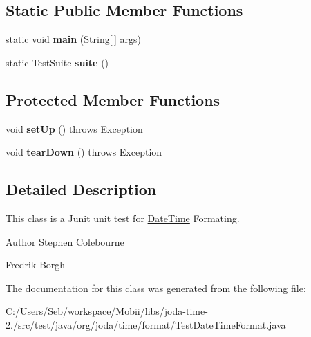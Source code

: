 \subsection*{Static Public Member Functions}
\begin{DoxyCompactItemize}
\item 
\hypertarget{classorg_1_1joda_1_1time_1_1format_1_1_test_date_time_format_a6bf52ec576ba25e37214143a1096e07a}{static void {\bfseries main} (String\mbox{[}$\,$\mbox{]} args)}\label{classorg_1_1joda_1_1time_1_1format_1_1_test_date_time_format_a6bf52ec576ba25e37214143a1096e07a}

\item 
\hypertarget{classorg_1_1joda_1_1time_1_1format_1_1_test_date_time_format_a2f379f8b16a4cc6ab854bc2ec1f728f0}{static Test\-Suite {\bfseries suite} ()}\label{classorg_1_1joda_1_1time_1_1format_1_1_test_date_time_format_a2f379f8b16a4cc6ab854bc2ec1f728f0}

\end{DoxyCompactItemize}
\subsection*{Protected Member Functions}
\begin{DoxyCompactItemize}
\item 
\hypertarget{classorg_1_1joda_1_1time_1_1format_1_1_test_date_time_format_abc74b80dc188451095e200a67c11190f}{void {\bfseries set\-Up} ()  throws Exception }\label{classorg_1_1joda_1_1time_1_1format_1_1_test_date_time_format_abc74b80dc188451095e200a67c11190f}

\item 
\hypertarget{classorg_1_1joda_1_1time_1_1format_1_1_test_date_time_format_a176453dbec0cd5db983706df8d802ce6}{void {\bfseries tear\-Down} ()  throws Exception }\label{classorg_1_1joda_1_1time_1_1format_1_1_test_date_time_format_a176453dbec0cd5db983706df8d802ce6}

\end{DoxyCompactItemize}


\subsection{Detailed Description}
This class is a Junit unit test for \hyperlink{classorg_1_1joda_1_1time_1_1_date_time}{Date\-Time} Formating.

\begin{DoxyAuthor}{Author}
Stephen Colebourne 

Fredrik Borgh 
\end{DoxyAuthor}


The documentation for this class was generated from the following file\-:\begin{DoxyCompactItemize}
\item 
C\-:/\-Users/\-Seb/workspace/\-Mobii/libs/joda-\/time-\/2./src/test/java/org/joda/time/format/Test\-Date\-Time\-Format.\-java\end{DoxyCompactItemize}
